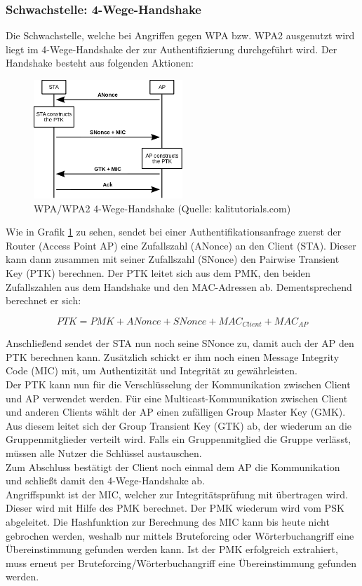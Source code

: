 \subsubsection{Schwachstelle: 4-Wege-Handshake} \label{4wh}
Die Schwachstelle, welche bei Angriffen gegen WPA bzw. WPA2 ausgenutzt wird liegt im 4-Wege-Handshake der zur Authentifizierung durchgeführt wird. Der Handshake besteht aus folgenden Aktionen:
\begin{figure}[ht!]
	\centering
	\includegraphics[width=0.5\textwidth]{images/WLAN/handshake.png}
	\caption{WPA/WPA2 4-Wege-Handshake (Quelle: kalitutorials.com)}
	\label{fig:WPA handshake}
\end{figure}

Wie in Grafik \ref{fig:WPA handshake} zu sehen, sendet bei einer Authentifikationsanfrage zuerst der Router (Access Point AP) eine Zufallszahl (ANonce) an den Client (STA). Dieser kann dann zusammen mit seiner Zufallszahl (SNonce) den Pairwise Transient Key (PTK) berechnen. Der PTK leitet sich aus dem PMK, den beiden Zufallszahlen aus dem Handshake und den MAC-Adressen ab. Dementsprechend berechnet er sich:

\begin{equation}
PTK = PMK + ANonce +SNonce  + MAC_{Client} + MAC_{AP}
\end{equation}

Anschließend sendet der STA nun noch seine SNonce zu, damit auch der AP den PTK berechnen kann. Zusätzlich schickt er ihm noch einen Message Integrity Code (MIC) mit, um Authentizität und Integrität zu gewährleisten. \\
Der PTK kann nun für die Verschlüsselung der Kommunikation zwischen Client und AP verwendet werden. Für eine Multicast-Kommunikation zwischen Client und anderen Clients wählt der AP einen zufälligen Group Master Key (GMK). Aus diesem leitet sich der Group Transient Key (GTK) ab, der wiederum an die Gruppenmitglieder verteilt wird. Falls ein Gruppenmitglied die Gruppe verlässt, müssen alle Nutzer die Schlüssel austauschen. \\
Zum Abschluss bestätigt der Client noch einmal dem AP die Kommunikation und schließt damit den 4-Wege-Handshake ab.\\
Angriffspunkt ist der MIC, welcher zur Integritätsprüfung mit übertragen wird. Dieser wird mit Hilfe des PMK berechnet. Der PMK wiederum wird vom PSK abgeleitet. Die Hashfunktion zur Berechnung des MIC kann bis heute nicht gebrochen werden, weshalb nur mittels Bruteforcing oder Wörterbuchangriff eine Übereinstimmung gefunden werden kann. Ist der PMK erfolgreich extrahiert, muss erneut per Bruteforcing/Wörterbuchangriff eine Übereinstimmung gefunden werden.

